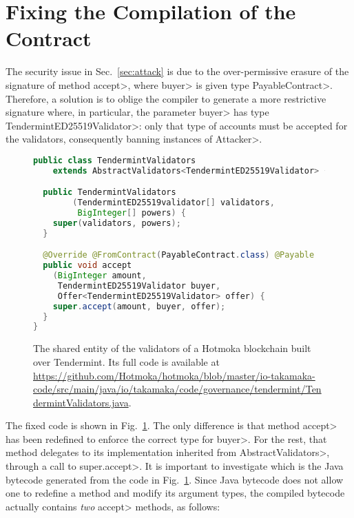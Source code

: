 \section{Fixing the Compilation of the Contract} \label{sec:fix}

The security issue in Sec.~\ref{sec:attack} is due to the
over-permissive erasure of the signature of method \<accept>,
where \<buyer> is given type \<PayableContract>.
Therefore, a solution is to oblige the compiler to generate a more
restrictive signature where, in particular, the parameter \<buyer>
has type \<TendermintED25519Validator>: only that type of accounts
must be accepted for the validators, consequently banning instances of \<Attacker>.

\begin{figure}[t]
  \begin{center}
    \begin{lstlisting}[language=Java]
public class TendermintValidators
    extends AbstractValidators<TendermintED25519Validator> {

  public TendermintValidators
        (TendermintED25519validator[] validators, 
         BigInteger[] powers) {
    super(validators, powers);
  }

  @Override @FromContract(PayableContract.class) @Payable
  public void accept
    (BigInteger amount, 
     TendermintED25519Validator buyer, 
     Offer<TendermintED25519Validator> offer) {
    super.accept(amount, buyer, offer);
  }
}
    \end{lstlisting}
  \end{center}
  \caption{The shared entity of the validators of a Hotmoka blockchain built over Tendermint.
  Its full code is available at \url{https://github.com/Hotmoka/hotmoka/blob/master/io-takamaka-code/src/main/java/io/takamaka/code/governance/tendermint/TendermintValidators.java}.}\label{fig:solution}
\end{figure}

The fixed code is shown in Fig.~\ref{fig:solution}. The only difference is that method
\<accept> has been redefined to enforce the correct type for \<buyer>. For the rest, that method
delegates to its implementation inherited from \<AbstractValidators>, through a call
to \<super.accept>.
It is important to investigate which is the Java bytecode generated from
the code in Fig.~\ref{fig:solution}. Since Java bytecode does not allow one to redefine a method
and modify its argument types, the compiled bytecode actually contains \emph{two}
\<accept> methods, as follows:

